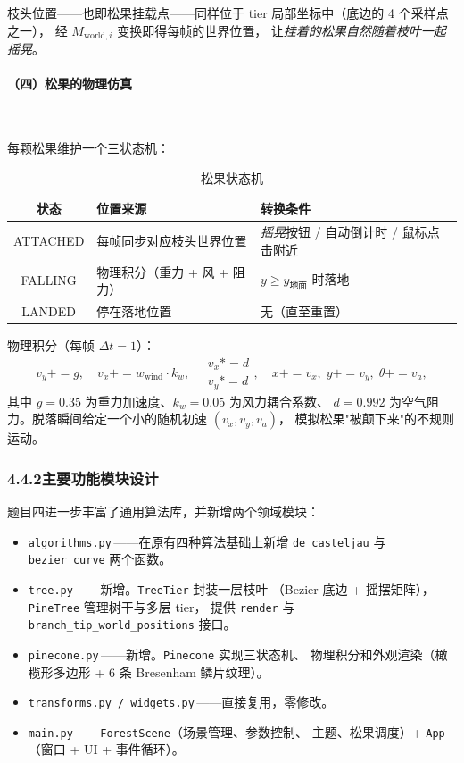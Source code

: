 \documentclass[12pt, a4paper]{article}
\begin{document}
枝头位置——也即松果挂载点——同样位于 tier 局部坐标中（底边的 4 个采样点之一），
经 $M_{\text{world},i}$ 变换即得每帧的世界位置，
让\textit{挂着的松果自然随着枝叶一起摇晃}。

\paragraph{（四）松果的物理仿真}~

每颗松果维护一个三状态机：

\begin{table}[H]
\centering
\renewcommand{\arraystretch}{1.3}
\begin{tabular}{|c|p{4.4cm}|p{6cm}|}
\hline
\textbf{状态} & \textbf{位置来源} & \textbf{转换条件} \\
\hline
ATTACHED & 每帧同步对应枝头世界位置 &
\textit{摇晃}按钮 / 自动倒计时 / 鼠标点击附近 \\
\hline
FALLING & 物理积分（重力 + 风 + 阻力） & $y \ge y_{\text{地面}}$ 时落地 \\
\hline
LANDED & 停在落地位置 & 无（直至重置） \\
\hline
\end{tabular}
\caption{松果状态机}
\end{table}

物理积分（每帧 $\Delta t = 1$）：
\[
v_y \mathrel{+{=}} g,\quad
v_x \mathrel{+{=}} w_{\text{wind}} \cdot k_w,\quad
\begin{aligned}v_x \mathrel{*{=}} d \\ v_y \mathrel{*{=}} d\end{aligned},\quad
x \mathrel{+{=}} v_x,\;
y \mathrel{+{=}} v_y,\;
\theta \mathrel{+{=}} v_a,
\]
其中 $g = 0.35$ 为重力加速度、$k_w = 0.05$ 为风力耦合系数、
$d = 0.992$ 为空气阻力。脱落瞬间给定一个小的随机初速 $(v_x, v_y, v_a)$，
模拟松果"被颠下来"的不规则运动。

\subsubsection*{4.4.2\quad 主要功能模块设计}

题目四进一步丰富了通用算法库，并新增两个领域模块：

\begin{itemize}[leftmargin=*]
    \item \texttt{algorithms.py}\,——在原有四种算法基础上新增
    \texttt{de\_casteljau} 与 \texttt{bezier\_curve} 两个函数。
    \item \texttt{tree.py}\,——新增。\texttt{TreeTier} 封装一层枝叶
    （Bezier 底边 + 摇摆矩阵），\texttt{PineTree} 管理树干与多层 tier，
    提供 \texttt{render} 与 \texttt{branch\_tip\_world\_positions} 接口。
    \item \texttt{pinecone.py}\,——新增。\texttt{Pinecone} 实现三状态机、
    物理积分和外观渲染（橄榄形多边形 + 6 条 Bresenham 鳞片纹理）。
    \item \texttt{transforms.py / widgets.py}\,——直接复用，零修改。
    \item \texttt{main.py}\,——\texttt{ForestScene}（场景管理、参数控制、
    主题、松果调度）+ \texttt{App}（窗口 + UI + 事件循环）。
\end{itemize}
\end{document}
